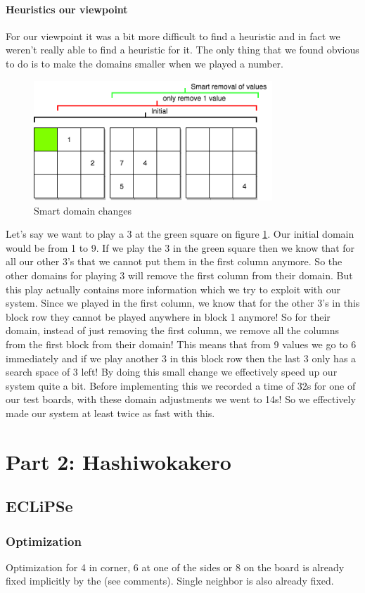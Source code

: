 \documentclass{report}
\newcommand{\mychapter}[2]{
    \setcounter{chapter}{#1}
    \setcounter{section}{0}
    \chapter*{#2}
    \addcontentsline{toc}{chapter}{#2}
}
\begin{document}
\newpage
\subsubsection{Heuristics our viewpoint}
For our viewpoint it was a bit more difficult to find a heuristic and in fact we weren't really able to find a heuristic for it. The only thing that we found obvious to do is to make the domains smaller when we played a number.
\begin{figure}[h!]
\centering
\includegraphics[width=0.8\textwidth]{smartremoval}
\caption{Smart domain changes}
\label{fig:smart_domain}
\end{figure}
Let's say we want to play a 3 at the green square on figure \ref{fig:smart_domain}. Our initial domain would be from 1 to 9. If we play the 3 in the green square then we know that for all our other 3's that we cannot put them in the first column anymore. So the other domains for playing 3 will remove the first column from their domain. But this play actually contains more information which we try to exploit with our system. Since we played in the first column, we know that for the other 3's in this block row they cannot be played anywhere in block 1 anymore! So for their domain, instead of just removing the first column, we remove all the columns from the first block from their domain! This means that from 9 values we go to 6 immediately and if we play another 3 in this block row then the last 3 only has a search space of 3 left! By doing this small change we effectively speed up our system quite a bit. Before implementing this we recorded a time of 32s for one of our test boards, with these domain adjustments we went to 14s! So we effectively made our system at least twice as fast with this.
\mychapter{2}{Part 2: Hashiwokakero}
\label{sec:Hashiwokakero}
\section{ECLiPSe}
\subsection{Optimization}
Optimization for 4 in corner, 6 at one of the sides or 8 on the board is already fixed implicitly by the
(see comments). Single neighbor is also already fixed.
\end{document}
